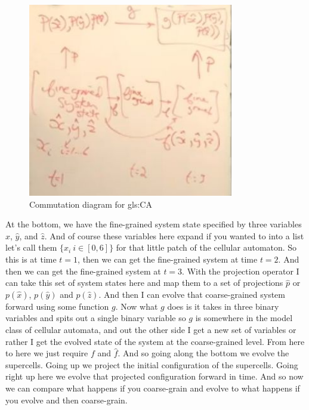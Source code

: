 \documentclass[]{article}
\begin{document}
\begin{figure}[H]
	\begin{center}
		\caption{Commutation diagram for \glsdesc{gls:CA}}
		\includegraphics[width=0.8\textwidth]{commutation-2}
	\end{center}
\end{figure}
At the bottom, we have the fine-grained system state specified by three variables $\hat{x}$, $\hat{y}$, and $\hat{z}$.
And of course these variables here expand
if you wanted to into a list let's call them $\{x_i\: i \in [0,6]\}$ for that little patch of the cellular automaton.
So this is at time $t=1$, then we can get the fine-grained system at time $t=2$.
And then we can get the fine-grained system at $t=3$.
With the projection operator I can take this set of system states here
and map them to a set of projections $\hat{p}$ or $p(\hat{x})$,  $p(\hat{y})$ and  $p(\hat{z})$.
And then I can evolve that coarse-grained system forward using some function $g$.
Now what $g$ does is it takes in three binary variables and spits out a single binary variable so $g$ is somewhere in the model class of cellular automata, and out the other side I get a new set of variables or rather I get the evolved state of the system at the coarse-grained level.
From here to here we just require $f$ and $\hat{f}$.
And so going along the bottom we evolve the supercells.
Going up we project the initial configuration of the supercells.
Going right up here we evolve that projected configuration forward in time.
And so now we can compare what happens if you coarse-grain and evolve to what happens if you evolve and then coarse-grain.
\end{document}

